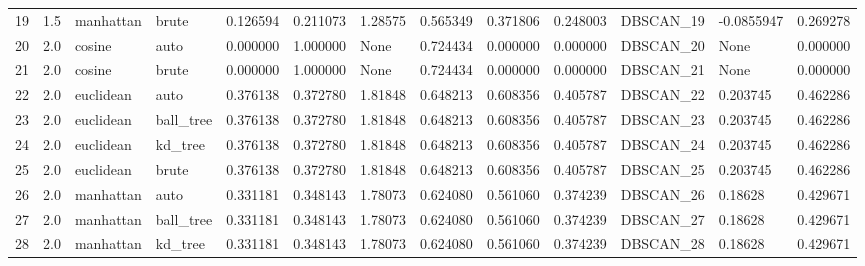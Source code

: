 \begin{tabular}{lrllrrlrrrllr}
19 &  1.5 &  manhattan &      brute &             0.126594 &            0.211073 &              1.28575 &               0.565349 &           0.371806 &           0.248003 &  DBSCAN\_19 &       -0.0855947 &         0.269278 \\
20 &  2.0 &     cosine &       auto &             0.000000 &            1.000000 &                 None &               0.724434 &           0.000000 &           0.000000 &  DBSCAN\_20 &             None &         0.000000 \\
21 &  2.0 &     cosine &      brute &             0.000000 &            1.000000 &                 None &               0.724434 &           0.000000 &           0.000000 &  DBSCAN\_21 &             None &         0.000000 \\
22 &  2.0 &  euclidean &       auto &             0.376138 &            0.372780 &              1.81848 &               0.648213 &           0.608356 &           0.405787 &  DBSCAN\_22 &         0.203745 &         0.462286 \\
23 &  2.0 &  euclidean &  ball\_tree &             0.376138 &            0.372780 &              1.81848 &               0.648213 &           0.608356 &           0.405787 &  DBSCAN\_23 &         0.203745 &         0.462286 \\
24 &  2.0 &  euclidean &    kd\_tree &             0.376138 &            0.372780 &              1.81848 &               0.648213 &           0.608356 &           0.405787 &  DBSCAN\_24 &         0.203745 &         0.462286 \\
25 &  2.0 &  euclidean &      brute &             0.376138 &            0.372780 &              1.81848 &               0.648213 &           0.608356 &           0.405787 &  DBSCAN\_25 &         0.203745 &         0.462286 \\
26 &  2.0 &  manhattan &       auto &             0.331181 &            0.348143 &              1.78073 &               0.624080 &           0.561060 &           0.374239 &  DBSCAN\_26 &          0.18628 &         0.429671 \\
27 &  2.0 &  manhattan &  ball\_tree &             0.331181 &            0.348143 &              1.78073 &               0.624080 &           0.561060 &           0.374239 &  DBSCAN\_27 &          0.18628 &         0.429671 \\
28 &  2.0 &  manhattan &    kd\_tree &             0.331181 &            0.348143 &              1.78073 &               0.624080 &           0.561060 &           0.374239 &  DBSCAN\_28 &          0.18628 &         0.429671 \\

\end{tabular}
